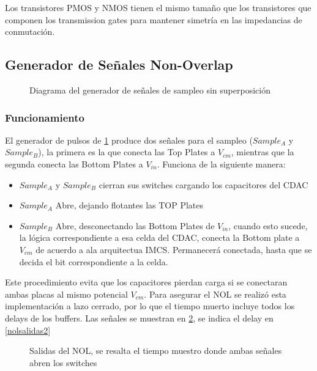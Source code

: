 \documentclass[12pt,a4paper]{report}
\begin{document}
Los transistores PMOS y NMOS tienen el mismo tamaño que los transistores que componen los transmission gates para mantener simetría en las impedancias de conmutación.


\subsection{Generador de Señales Non-Overlap}
\begin{figure}[H]
    \centering
    
    \caption{Diagrama del generador de señales de sampleo sin superposición}
    \label{noldiag}
\end{figure}



\subsubsection{Funcionamiento}

El generador de pulsos de \cref{noldiag} produce dos señales para el sampleo ($Sample_A$ y $Sample_B$), la primera es la que conecta las  Top Plates a $V_{cm}$, mientras que la segunda conecta las Bottom Plates a $V_{in}$. Funciona de la siguiente manera:
\begin{itemize}
    \item $Sample_A$ y $Sample_B$ cierran sus switches cargando los capacitores del CDAC
    \item $Sample_A$ Abre, dejando flotantes las TOP Plates
    \item $Sample_B$ Abre, desconectando las Bottom Plates de $V_{in}$, cuando esto sucede, la lógica correspondiente a esa celda del CDAC, conecta la Bottom plate a $V_{cm}$ de acuerdo a ala arquitectua IMCS. Permanecerá conectada, hasta que se decida el bit correspondiente a la celda.
\end{itemize}

Este procedimiento evita que los capacitores pierdan carga si se conectaran ambas placas al mismo potencial $V_{cm}$. Para asegurar el NOL se realizó esta implementación a lazo cerrado, por lo que el tiempo muerto incluye todos los delays de los buffers. Las señales se muestran en \cref{nolsalidas}, se indica el delay en \cref{nolsalidas2}


\begin{figure}[H]
    \centering
    
    \caption{Salidas del NOL, se resalta el tiempo muestro donde ambas señales abren los switches}
        \label{nolsalidas}
\end{figure}
\end{document}
